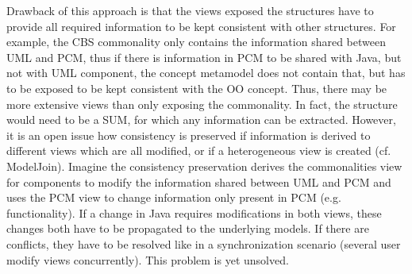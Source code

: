 Drawback of this approach is that the views exposed the structures have to provide all required information to be kept consistent with other structures. For example, the CBS commonality only contains the information shared between UML and PCM, thus if there is information in PCM to be shared with Java, but not with UML component, the concept metamodel does not contain that, but has to be exposed to be kept consistent with the OO concept. Thus, there may be more extensive views than only exposing the commonality. In fact, the structure would need to be a SUM, for which any information can be extracted. However, it is an open issue how consistency is preserved if information is derived to different views which are all modified, or if a heterogeneous view is created (cf. ModelJoin). Imagine the consistency preservation derives the commonalities view for components to modify the information shared between UML and PCM and uses the PCM view to change information only present in PCM (e.g. functionality). If a change in Java requires modifications in both views, these changes both have to be propagated to the underlying models. If there are conflicts, they have to be resolved like in a synchronization scenario (several user modify views concurrently). This problem is yet unsolved.


